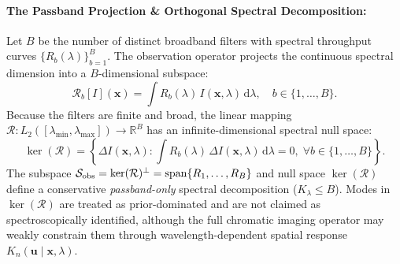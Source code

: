 \documentclass[11pt,a4paper]{article}
\begin{document}
\paragraph{The Passband Projection \& Orthogonal Spectral Decomposition:}
Let $B$ be the number of distinct broadband filters with spectral throughput curves $\{R_b(\lambda)\}_{b=1}^B$. The observation operator projects the continuous spectral dimension into a $B$-dimensional subspace:
\begin{equation}
\mathcal{R}_b[I](\boldsymbol{x}) = \int R_b(\lambda) \, I(\boldsymbol{x}, \lambda) \, \mathrm{d}\lambda, \quad b \in \{1, \dots, B\}.
\end{equation}
Because the filters are finite and broad, the linear mapping $\mathcal{R}: L_2([\lambda_{\min}, \lambda_{\max}]) \to \mathbb{R}^B$ has an infinite-dimensional spectral null space:
\begin{equation}
\ker(\mathcal{R}) = \left\{ \Delta I(\boldsymbol{x}, \lambda) : \int R_b(\lambda) \, \Delta I(\boldsymbol{x}, \lambda) \, \mathrm{d}\lambda = 0, \; \forall b \in \{1, \dots, B\} \right\}.
\end{equation}
The subspace $\mathcal{S}_{\rm obs} = \ker(\mathcal{R})^\perp = \mathrm{span}\{R_1, \dots, R_B\}$ and null space $\ker(\mathcal{R})$ define a conservative \emph{passband-only} spectral decomposition ($K_\lambda \le B$). Modes in $\ker(\mathcal{R})$ are treated as prior-dominated and are not claimed as spectroscopically identified, although the full chromatic imaging operator may weakly constrain them through wavelength-dependent spatial response $K_n(\boldsymbol{u}\mid\boldsymbol{x},\lambda)$.
\end{document}
